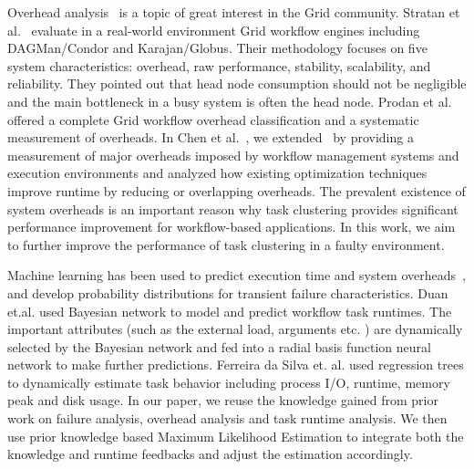\documentclass{IOS-Book-Article}
\begin{document}
Overhead analysis~\cite{Ostberg2011, Prodan2008} is a topic of great interest in the Grid community. Stratan et al.~\cite{Stratan2008} evaluate in a real-world environment Grid workflow engines including DAGMan/Condor and Karajan/Globus. Their methodology focuses on five system characteristics: overhead, raw performance, stability, scalability, and reliability. They pointed out that head node consumption should not be negligible and the main bottleneck in a busy system is often the head node. Prodan et al.~\cite{Prodan2008} offered a complete Grid workflow overhead classification and a systematic measurement of overheads. In Chen et al.~\cite{Chen2011}, we extended~\cite{Prodan2008} by providing a measurement of major overheads imposed by workflow management systems and execution environments and analyzed how existing optimization techniques improve runtime by reducing or overlapping overheads. The prevalent existence of system overheads is an important reason why task clustering provides significant performance improvement for workflow-based applications. In this work, we aim to further improve the performance of task clustering in a faulty environment. 

Machine learning has been used to predict execution time \cite{Rubing2009, 1015660, 1542747, da2013toward} and system overheads~\cite{Chen2011}, and develop probability distributions for transient failure characteristics. Duan et.al. \cite{Rubing2009} used Bayesian network to model and predict workflow task runtimes. The important attributes (such as the external load, arguments etc. ) are dynamically selected by the Bayesian network and fed into a radial basis function neural network to make further predictions. Ferreira da Silva et. al. \cite{da2013toward} used regression trees to dynamically estimate task behavior including process I/O, runtime, memory peak and disk usage. In our paper, we reuse the knowledge gained from prior work on failure analysis, overhead analysis and task runtime analysis. We then use prior knowledge based Maximum Likelihood Estimation to integrate both the knowledge and runtime feedbacks and adjust the estimation accordingly. 
\end{document}
